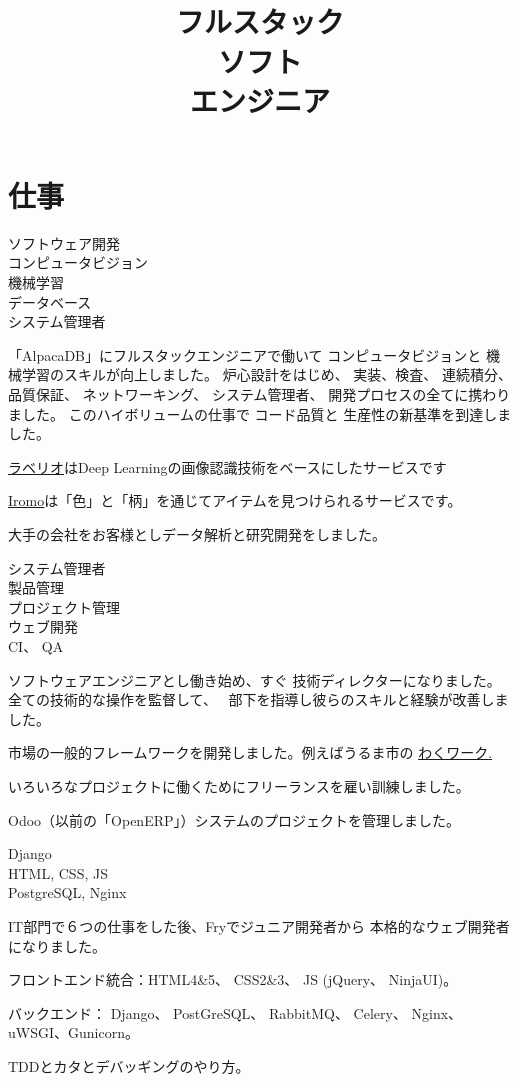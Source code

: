 \documentclass[a4paper,11pt]{cv4tw}%
\title{\\ フルスタック\\ソフト\\エンジニア}
\begin{document}
\section{仕事}
{ソフトウェア開発\\コンピュータビジョン\\ 機械学習\\データベース\\システム管理者}
    {
      「AlpacaDB」にフルスタックエンジニアで働いて コンピュータビジョンと
       機械学習のスキルが向上しました。
       炉心設計をはじめ、 実装、検査、 連続積分、 品質保証、 ネットワーキング、
       システム管理者、 開発プロセスの全てに携わりました。
       このハイボリュームの仕事で コード品質と 生産性の新基準を到達しました。
	\begin{missions}
        \item \underline{\href{http://www.labell.io/}{ラベリオ}}はDeep
            Learningの画像認識技術をベースにしたサービスです
        \item \underline{\href{http://iromo.jp}{Iromo}}は「色」と「柄」を通じてアイテムを見つけられるサービスです。
        \item 大手の会社をお客様としデータ解析と研究開発をしました。
	\end{missions}
}
{システム管理者\\製品管理\\プロジェクト管理\\ウェブ開発\\CI、 QA}
	{ ソフトウェアエンジニアとし働き始め、すぐ
        技術ディレクターになりました。全ての技術的な操作を監督して、　
        部下を指導し彼らのスキルと経験が改善しました。
	\begin{missions}
        \item 市場の一般的フレームワークを開発しました。例えばうるま市の
            \underline{\href{https://uruma-work.com}{わくワーク}.}
        \item いろいろなプロジェクトに働くためにフリーランスを雇い訓練しました。
        \item Odoo（以前の「OpenERP」）システムのプロジェクトを管理しました。
	\end{missions}
}

{Django\\HTML, CSS, JS\\PostgreSQL, Nginx}
	{ IT部門で６つの仕事をした後、Fryでジュニア開発者から 
      本格的なウェブ開発者になりました。
	\begin{missions}
    \item フロントエンド統合：HTML4\&5、 CSS2\&3、 JS (jQuery、 NinjaUI)。
    \item バックエンド： Django、 PostGreSQL、 RabbitMQ、 Celery、 Nginx、
        uWSGI、Gunicorn。
    \item TDDとカタとデバッギングのやり方。
	\end{missions}
}
\end{document}
